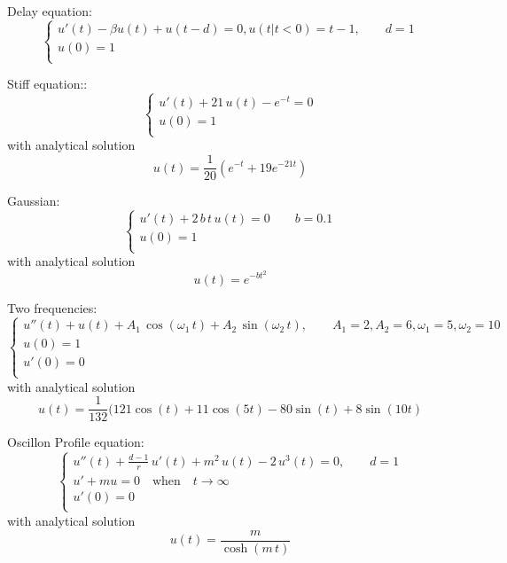 \documentclass{article}
\begin{document}
\begin{enumerate}[label={[\arabic*]}]
\item{Delay equation:
\[\left\{ \begin{array}{llllllll}
u'(t)-\beta u(t) + u(t-d)=0, u(t|t<0) = t-1, \qquad d=1\\
u(0)=1\\
\end{array}
\right.\]\label{eq:Delay}}

\item{Stiff equation::
\[\left\{ \begin{array}{llllllll}
u'(t)+21\, u(t) - e^{-t} = 0\\
u(0)=1\\
\end{array}
\right.\]
with analytical solution
\[u(t) =\displaystyle \frac{1}{20}\left(e^{-t}+19e^{-21 t}\right)\]\label{eq:Stiff}}

\item{Gaussian:
\[\left\{ \begin{array}{llllllll}
u'(t)+2\,b\,t\, u(t) =0 \qquad b=0.1\\
u(0)=1\\
\end{array}
\right.\]
with analytical solution
\[u(t) =\displaystyle e^{-b t^2}\]\label{eq:Gaussian}}

\item{Two frequencies:
\[\left\{ \begin{array}{llllllll}
u''(t)+u(t) + A_1\, \cos(\omega_1\, t)+A_2\, \sin(\omega_2\, t), \qquad A_1 = 2, A_2=6, \omega_1=5, \omega_2 = 10\\
u(0)=1\\
u'(0)=0\\
\end{array}
\right.\]
with analytical solution
\[u(t) = \frac{1}{132}(121 \cos(t) + 11 \cos(5t)-80\sin(t)+8\sin(10t)\]\label{eq:DoubleFreq}}

\item{Oscillon Profile equation:
\[\left\{ \begin{array}{llllllll}
u''(t)+\frac{d-1}{r}\,u'(t)+m^2\,u(t)-2\,u^3(t) = 0, \qquad d=1\\
u'+m u =0 \quad \mbox{when}\quad  t\rightarrow \infty\\
u'(0)=0\\
\end{array}
\right.\]
with analytical solution
\[u(t) = \displaystyle \frac{m}{\cosh(m\, t)}\]\label{eq:Oscillon}}


\end{enumerate}
\end{document}
